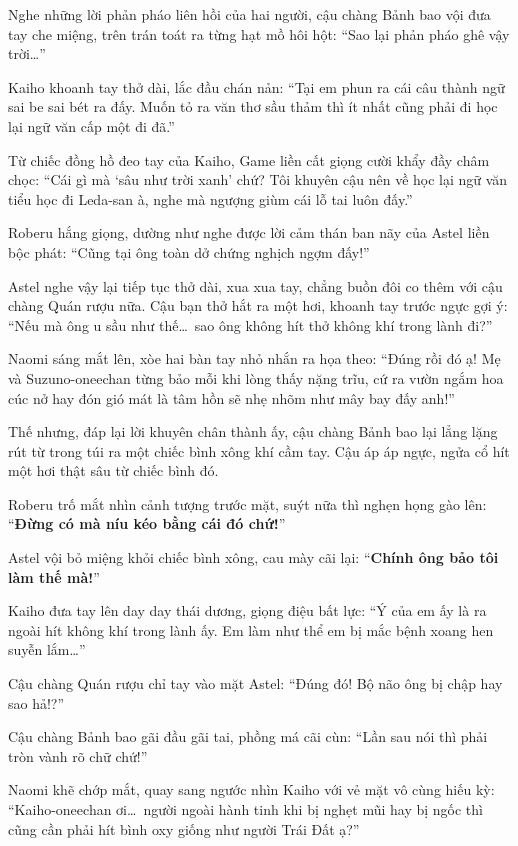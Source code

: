 \documentclass[../main.tex]{subfiles}
\begin{document}
Nghe những lời phản pháo liên hồi của hai người, cậu chàng Bảnh bao vội đưa tay che miệng, trên trán toát ra từng hạt mồ hôi hột: ``Sao lại phản pháo ghê vậy trời\dots''


Kaiho khoanh tay thở dài, lắc đầu chán nản: ``Tại em phun ra cái câu thành ngữ sai be sai bét ra đấy. Muốn tỏ ra văn thơ sầu thảm thì ít nhất cũng phải đi học lại ngữ văn cấp một đi đã.''

Từ chiếc đồng hồ đeo tay của Kaiho, Game liền cất giọng cười khẩy đầy châm chọc: ``Cái gì mà `sâu như trời xanh' chứ? Tôi khuyên cậu nên về học lại ngữ văn tiểu học đi Leda-san à, nghe mà ngượng giùm cái lỗ tai luôn đấy.''

Roberu hắng giọng, dường như nghe được lời cảm thán ban nãy của Astel liền bộc phát: ``Cũng tại ông toàn dở chứng nghịch ngợm đấy!''

Astel nghe vậy lại tiếp tục thở dài, xua xua tay, chẳng buồn đôi co thêm với cậu chàng Quán rượu nữa. Cậu bạn thở hắt ra một hơi, khoanh tay trước ngực gợi ý: ``Nếu mà ông u sầu như thế\dots\ sao ông không hít thở không khí trong lành đi?''

Naomi sáng mắt lên, xòe hai bàn tay nhỏ nhắn ra họa theo: ``Đúng rồi đó ạ! Mẹ và Suzuno-oneechan từng bảo mỗi khi lòng thấy nặng trĩu, cứ ra vườn ngắm hoa cúc nở hay đón gió mát là tâm hồn sẽ nhẹ nhõm như mây bay đấy anh!''

Thế nhưng, đáp lại lời khuyên chân thành ấy, cậu chàng Bảnh bao lại lẳng lặng rút từ trong túi ra một chiếc bình xông khí cầm tay. Cậu áp áp ngực, ngửa cổ hít một hơi thật sâu từ chiếc bình đó.


Roberu trố mắt nhìn cảnh tượng trước mặt, suýt nữa thì nghẹn họng gào lên: ``\textbf{Đừng có mà níu kéo bằng cái đó chứ!}''

Astel vội bỏ miệng khỏi chiếc bình xông, cau mày cãi lại: ``\textbf{Chính ông bảo tôi làm thế mà!}''

Kaiho đưa tay lên day day thái dương, giọng điệu bất lực: ``Ý của em ấy là ra ngoài hít không khí trong lành ấy. Em làm như thể em bị mắc bệnh xoang hen suyễn lắm\dots''

Cậu chàng Quán rượu chỉ tay vào mặt Astel: ``Đúng đó! Bộ não ông bị chập hay sao hả!?''

Cậu chàng Bảnh bao gãi đầu gãi tai, phồng má cãi cùn: ``Lần sau nói thì phải tròn vành rõ chữ chứ!''

Naomi khẽ chớp mắt, quay sang ngước nhìn Kaiho với vẻ mặt vô cùng hiếu kỳ: ``Kaiho-oneechan ơi\dots\ người ngoài hành tinh khi bị nghẹt mũi hay bị ngốc thì cũng cần phải hít bình oxy giống như người Trái Đất ạ?''
\end{document}
